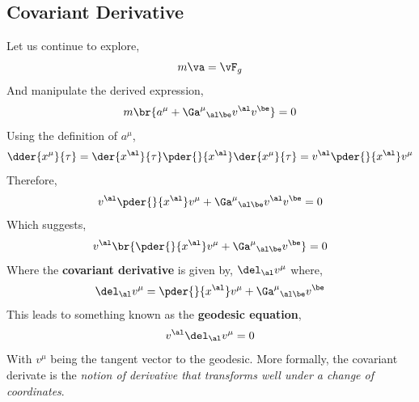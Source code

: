 \documentclass{article}
\begin{document}
\subsection{Covariant Derivative}
\label{sec:covariantderivative}
Let us continue to explore,
\[ m \va = \vF_g \]
And manipulate the derived expression,
\[ m \br{a^\mu + {\Ga^\mu}_{\al\be}v^\al v^\be} = 0 \]
Using the definition of $a^\mu$,
\[ \dder{x^\mu}{\tau} = \der{x^\al}{\tau} \pder{}{x^\al} \der{x^\mu}{\tau} = v^\al \pder{}{x^\al} v^\mu \]
Therefore,
\[ v^\al \pder{}{x^\al} v^\mu + {\Ga^\mu}_{\al\be}v^\al v^\be = 0\]
Which suggests,
\[ v^\al \br{\pder{}{x^\al} v^\mu + {\Ga^\mu}_{\al\be} v^\be} = 0 \]
Where the \textbf{covariant derivative} is given by, $\del_\al v^\mu$ where,
\[ \del_\al v^\mu = \pder{}{x^\al} v^\mu + {\Ga^\mu}_{\al\be} v^\be \]
This leads to something known as the \textbf{geodesic equation},
\[ v^\al \del_\al v^\mu = 0 \]
With $v^\mu$ being the tangent vector to the geodesic. More formally, the covariant derivate is the \textit{notion of derivative that transforms well under a change of coordinates}.\\
\end{document}
